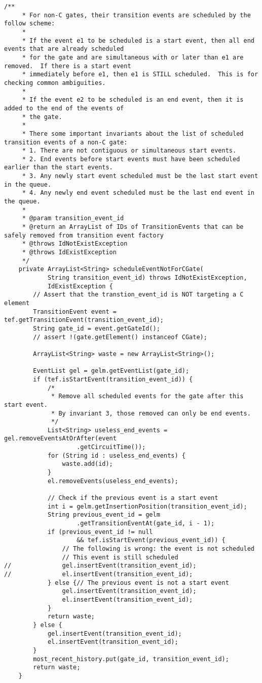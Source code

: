 \begin{lstlisting}[caption=Scheduler, label=listing8]
	/**
	 * For non-C gates, their transition events are scheduled by the follow scheme:
	 * 
	 * If the event e1 to be scheduled is a start event, then all end events that are already scheduled 
	 * for the gate and are simultaneous with or later than e1 are removed.  If there is a start event
	 * immediately before e1, then e1 is STILL scheduled.  This is for checking common ambiguities.
	 * 
	 * If the event e2 to be scheduled is an end event, then it is added to the end of the events of 
	 * the gate.
	 * 
	 * There some important invariants about the list of scheduled transition events of a non-C gate:
	 * 1. There are not contiguous or simultaneous start events.
	 * 2. End events before start events must have been scheduled earlier than the start events.
	 * 3. Any newly start event scheduled must be the last start event in the queue.
	 * 4. Any newly end event scheduled must be the last end event in the queue.
	 * 
	 * @param transition_event_id
	 * @return an ArrayList of IDs of TransitionEvents that can be safely removed from transition event factory
	 * @throws IdNotExistException
	 * @throws IdExistException 
	 */
	private ArrayList<String> scheduleEventNotForCGate(
			String transition_event_id) throws IdNotExistException,
			IdExistException {
		// Assert that the transtion_event_id is NOT targeting a C element
		TransitionEvent event = tef.getTransitionEvent(transition_event_id);
		String gate_id = event.getGateId();
		// assert !(gate.getElement() instanceof CGate);

		ArrayList<String> waste = new ArrayList<String>();

		EventList gel = gelm.getEventList(gate_id);
		if (tef.isStartEvent(transition_event_id)) {
			/* 
			 * Remove all scheduled events for the gate after this start event.  
			 * By invariant 3, those removed can only be end events.
			 */
			List<String> useless_end_events = gel.removeEventsAtOrAfter(event
					.getCircuitTime());
			for (String id : useless_end_events) {
				waste.add(id);
			}
			el.removeEvents(useless_end_events);

			// Check if the previous event is a start event
			int i = gelm.getInsertionPosition(transition_event_id);
			String previous_event_id = gelm
					.getTransitionEventAt(gate_id, i - 1);
			if (previous_event_id != null
					&& tef.isStartEvent(previous_event_id)) {
				// The following is wrong: the event is not scheduled
				// This event is still scheduled
//				gel.insertEvent(transition_event_id);
//				el.insertEvent(transition_event_id);
			} else {// The previous event is not a start event
				gel.insertEvent(transition_event_id);
				el.insertEvent(transition_event_id);
			}
			return waste;
		} else {
			gel.insertEvent(transition_event_id);
			el.insertEvent(transition_event_id);
		}
		most_recent_history.put(gate_id, transition_event_id);
		return waste;
	}
	

\end{lstlisting}
